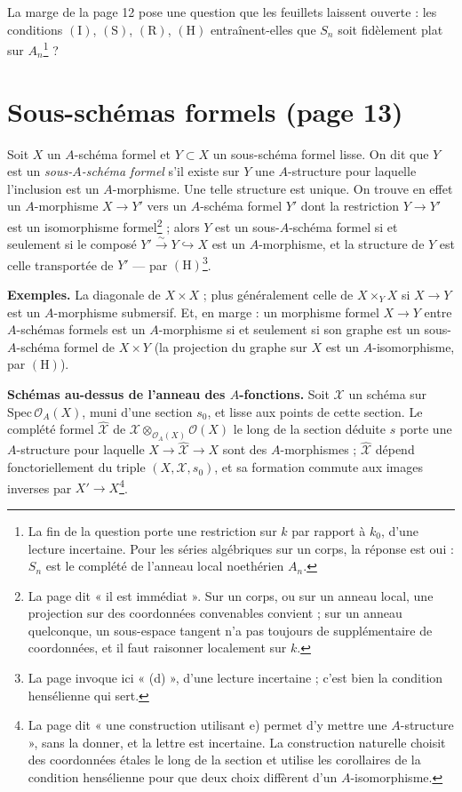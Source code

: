 \documentclass[11pt,a4paper]{article}
\begin{document}
La marge de la page 12 pose une question que les feuillets laissent ouverte :
les conditions $(\mathrm{I})$, $(\mathrm{S})$, $(\mathrm{R})$, $(\mathrm{H})$
entraînent-elles que $S_n$ soit fidèlement plat sur $A_n$\footnote{La fin de
la question porte une restriction sur $k$ par rapport à $k_0$, d'une lecture
incertaine. Pour les séries algébriques sur un corps, la réponse est oui :
$S_n$ est le complété de l'anneau local noethérien $A_n$.} ?

\section*{Sous-schémas formels (page 13)}

Soit $X$ un $A$-schéma formel et $Y \subset X$ un sous-schéma formel lisse. On
dit que $Y$ est un \emph{sous-$A$-schéma formel} s'il existe sur $Y$ une
$A$-structure pour laquelle l'inclusion est un $A$-morphisme. Une telle
structure est unique. On trouve en effet un $A$-morphisme $X \to Y'$ vers un
$A$-schéma formel $Y'$ dont la restriction $Y \to Y'$ est un isomorphisme
formel\footnote{La page dit « il est immédiat ». Sur un corps, ou sur un anneau
local, une projection sur des coordonnées convenables convient ; sur un
anneau quelconque, un sous-espace tangent n'a pas toujours de supplémentaire
de coordonnées, et il faut raisonner localement sur $k$.} ; alors $Y$ est un
sous-$A$-schéma formel si et seulement si le composé
$Y' \xrightarrow{\sim} Y \hookrightarrow X$ est un $A$-morphisme, et la structure
de $Y$ est celle transportée de $Y'$ — par $(\mathrm{H})$\footnote{La page
invoque ici « (d) », d'une lecture incertaine ; c'est bien la condition
hensélienne qui sert.}.

\textbf{Exemples.} La diagonale de $X \times X$ ; plus généralement celle de
$X \times_Y X$ si $X \to Y$ est un $A$-morphisme submersif. Et, en marge : un
morphisme formel $X \to Y$ entre $A$-schémas formels est un $A$-morphisme si et
seulement si son graphe est un sous-$A$-schéma formel de $X \times Y$ (la
projection du graphe sur $X$ est un $A$-isomorphisme, par $(\mathrm{H})$).

\textbf{Schémas au-dessus de l'anneau des $A$-fonctions.} Soit $\mathcal{X}$ un
schéma sur $\mathrm{Spec}\, \mathcal{O}_A(X)$, muni d'une section $s_0$, et lisse
aux points de cette section. Le complété formel $\widehat{\mathcal{X}}$ de
$\mathcal{X} \otimes_{\mathcal{O}_A(X)} \mathcal{O}(X)$ le long de la section déduite
$s$ porte une $A$-structure pour laquelle $X \to \widehat{\mathcal{X}} \to X$ sont
des $A$-morphismes ; $\widehat{\mathcal{X}}$ dépend fonctoriellement du triple
$(X, \mathcal{X}, s_0)$, et sa formation commute aux images inverses par
$X' \to X$\footnote{La page dit « une construction utilisant e) permet d'y
mettre une $A$-structure », sans la donner, et la lettre est incertaine. La
construction naturelle choisit des coordonnées étales le long de la section
et utilise les corollaires de la condition hensélienne pour que deux choix
diffèrent d'un $A$-isomorphisme.}.
\end{document}
